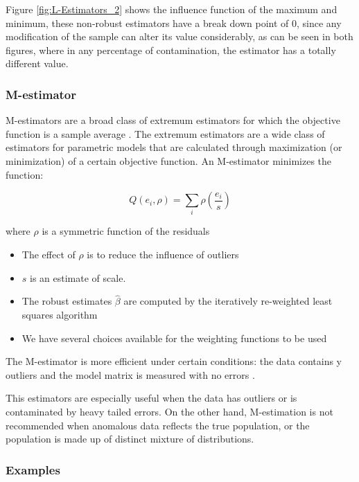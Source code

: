 \documentclass[11pt]{article}
\theoremstyle{definition}
\theoremstyle{remark}
\theoremstyle{remark}
\begin{document}
Figure \ref{fig:L-Estimators_2} shows the influence function of the
maximum and minimum, these non-robust estimators have a break down
point of 0, since any modification of the sample can alter its value
considerably, as can be seen in both figures, where in any percentage
of contamination, the estimator has a totally different value.

 \subsubsection*{M-estimator}

 M-estimators are a broad class of extremum estimators for which the
 objective function is a sample average \cite{andersen2008modern}. The
 extremum estimators are a wide class of estimators for parametric
 models that are calculated through maximization (or minimization) of
 a certain objective function. An M-estimator minimizes the function:

$$Q\left(e_{i}, \rho\right)=\sum_{i} \rho\left(\frac{e_{i}}{s}\right)$$

where $\rho$ is a symmetric function of the residuals

\begin{itemize}
\item The effect of $\rho$ is to reduce the influence of outliers
\item $s$ is an estimate of scale.
\item The robust estimates $\hat{\beta}$ are computed by the
  iteratively re-weighted least squares algorithm
\item We have several choices available for the weighting functions to
  be used
\end{itemize}

The M-estimator is more efficient under certain conditions: the data
contains y outliers and the model matrix is measured with no errors
\cite{susanti2014m}.

This estimators are especially useful when the data has outliers or is
contaminated by heavy tailed errors. On the
other hand, M-estimation is not recommended when anomalous data
reflects the true population, or the population is made up of distinct
mixture of distributions.

 \subsubsection*{Examples}
\end{document}
